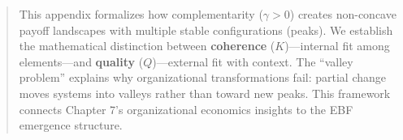 
\begin{abstract}
This appendix formalizes how complementarity ($\gamma > 0$) creates non-concave
payoff landscapes with multiple stable configurations (peaks). We establish the
mathematical distinction between \textbf{coherence} ($K$)---internal fit among
elements---and \textbf{quality} ($Q$)---external fit with context. The ``valley
problem'' explains why organizational transformations fail: partial change moves
systems into valleys rather than toward new peaks. This framework connects
Chapter 7's organizational economics insights to the EBF emergence structure.
\end{abstract}


